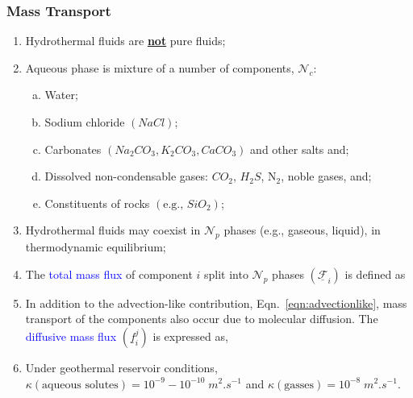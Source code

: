 \documentclass[10pt,compress]{beamer}
\newcommand{\blue}{\textcolor{blue}}
\begin{document}
\begin{frame}
 \frametitle{Mass Transport}
    \begin{enumerate}[1.]\scriptsize
       \item <1-> Hydrothermal fluids are {\bf \underline{not}} pure fluids;
       \item <2-> Aqueous phase is mixture of a number of components, $\mathcal{N}_{c}$:
          \begin{enumerate}[(a)]\scriptsize
             \item <2-> Water;
             \item <2-> Sodium chloride $\left(NaCl\right)$;
             \item <2-> Carbonates $\left(Na_{2}CO_{3}, K_{2}CO_{3}, CaCO_{3}\right)$ and other salts and;
             \item <3-> Dissolved non-condensable gases: $CO_{2}$, $H_{2}S$, N$_{2}$, noble gases, and;
             \item <4-> Constituents of rocks $\left(\text{e.g., }SiO_{2}\right)$;
          \end{enumerate}
       \item <5-> Hydrothermal fluids may coexist in $\mathcal{N}_{p}$ phases (e.g., gaseous, liquid), in thermodynamic equilibrium; 
       \item <6-> The \blue{total mass flux} of component $i$ split into $\mathcal{N}_{p}$ phases $\left(\underline{\mathcal{F}}_{i}\right)$ is defined as
       \item <7-> In addition to the advection-like contribution, Eqn.~\ref{eqn:advectionlike}, mass transport of the components also occur due to molecular diffusion. The \blue{diffusive mass flux} $\left(\underline{f}_{i}^{j}\right)$ is expressed as,
       \item <8-> Under geothermal reservoir conditions, $\kappa\left(\text{aqueous solutes}\right) = 10^{-9}-10^{-10}\;m^{2}.s^{-1}$ and $\kappa\left(\text{gasses}\right) = 10^{-8}\;m^{2}.s^{-1}$.
    \end{enumerate}

\end{frame}
\end{document}

